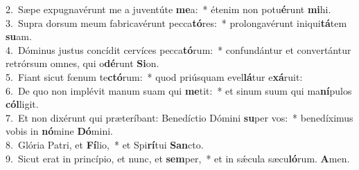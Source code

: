 {2.~}Sæpe expugnavérunt me a juventúte \textbf{me}a:~* étenim non potu\textbf{é}runt \textbf{mi}hi.\\
{3.~}Supra dorsum meum fabricavérunt pecca\textbf{tó}res:~* prolongavérunt iniqui\textbf{tá}tem \textbf{su}am.\\
{4.~}Dóminus justus concídit cervíces pecca\textbf{tó}rum:~* confundántur et convertántur retrórsum omnes, qui o\textbf{dé}runt \textbf{Si}on.\\
{5.~}Fiant sicut fœnum te\textbf{ctó}rum:~* quod priúsquam evel\textbf{lá}tur e\textbf{xá}ruit:\\
{6.~}De quo non implévit manum suam qui \textbf{me}tit:~* et sinum suum qui ma\textbf{ní}pulos \textbf{cól}ligit.\\
{7.~}Et non dixérunt qui præteríbant: Benedíctio Dómini \textbf{su}per vos:~* benedíximus vobis in \textbf{nó}mine \textbf{Dó}mini.\\
{8.~}Glória Patri, et \textbf{Fí}lio,~* et Spi\textbf{rí}tui \textbf{San}cto.\\
{9.~}Sicut erat in princípio, et nunc, et \textbf{sem}per,~* et in sǽcula sæcu\textbf{ló}rum. \textbf{A}men.\\
